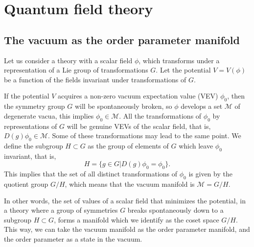 \section{Quantum field theory}\label{sec:qft}

\subsection{The vacuum as the order parameter manifold}\label{sec:vacuum}
Let us consider a theory with a scalar field $\phi$, which transforms under a representation of a Lie group of transformations $G$. Let the potential $V = V(\phi)$ be a function of the fields invariant under transformations of $G$.

If the potential  $V$ acquires a non-zero vacuum expectation value (VEV) $\phi_0$, then the symmetry group $G$ will be spontaneously broken, so $\phi$ develops a set $\mathcal{M}$ of degenerate vacua, this implies $\phi_0 \in \mathcal{M}$. All the transformations of $\phi_0$ by representations of $G$ will be genuine VEVs of the scalar field, that is, $D(g)\phi_0 \in \mathcal{M}$. Some of these transformations may lead to the same point. We define the subgroup $H\subset G$ as the group of elements of $G$ which leave $\phi_0$ invariant, that is,
\begin{equation}
	H = \{g\in G | D(g)\phi_0 = \phi_0\}.
\end{equation}
This implies that the set of all distinct transformations of $\phi_0$ is given by the quotient group $G/H$, which means that the vacuum manifold is $\mathcal{M}=G/H$.%

In other words, the set of values of a scalar field that minimizes the potential, in a theory where a group of symmetries $G$ breaks spontaneously down to a subgroup $H\subset G$, forms a manifold which we identify as the coset space $G/H$. This way, we can take the vacuum manifold as the order parameter manifold, and the order parameter as a state in the vacuum.




